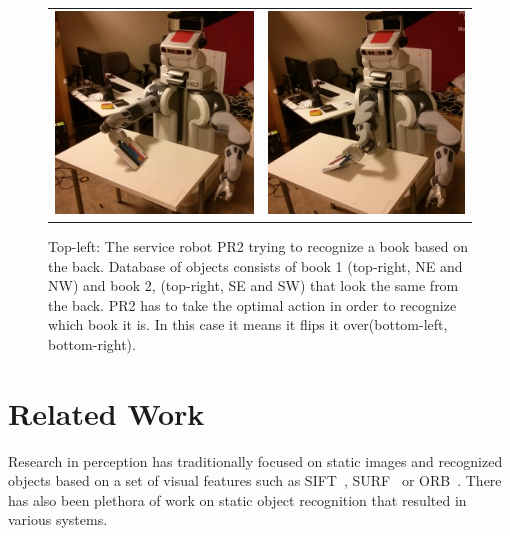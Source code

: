 \documentclass[conference]{IEEEtran}
\begin{document}
\begin{figure}[ht]
\begin{tabular}{cccc}
\multicolumn{2}{c}{\includegraphics[width=0.45\columnwidth]{pics/pr2_grasp.jpg}}
& \multicolumn{2}{c}{\includegraphics[width=0.45\columnwidth]{pics/pr2_rotate.jpg}}
\end{tabular}
\caption{Top-left: The service robot PR2 trying to recognize a book based on the back. Database of objects consists of book 1 (top-right, NE and NW) and book 2, (top-right, SE and SW) that look the same from the back. PR2 has to take the optimal action in order to recognize which book it is. In this case it means it flips it over(bottom-left, bottom-right).}
\label{fig:pr2}
\end{figure}


\section{Related Work}



	Research in perception has traditionally focused on  static 
images and recognized objects based on a set of visual features  such as SIFT~\cite{lowe2004distinctive}, SURF~\cite{bay2006surf} or ORB~\cite{rublee2011orb}.
There has also been plethora of work on static object recognition that resulted in various systems.
	
\end{document}
